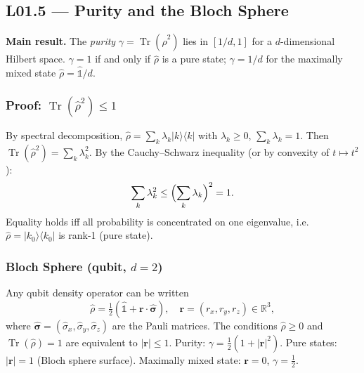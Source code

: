 \documentclass[11pt,a4paper]{article}
\begin{document}
\subsection{L01.5 --- Purity and the Bloch Sphere}
\label{sec:L01.3.3}

\begin{tcolorbox}[goldbox]
\textbf{Main result.}
The \emph{purity} $\gamma=\operatorname{Tr}(\hat{\rho}^2)$ lies in $[1/d,1]$
for a $d$-dimensional Hilbert space.
$\gamma=1$ if and only if $\hat{\rho}$ is a pure state;
$\gamma=1/d$ for the maximally mixed state $\hat{\rho}=\hat{\mathbb{1}}/d$.
\end{tcolorbox}

\subsubsection*{Proof: $\operatorname{Tr}(\hat{\rho}^2)\le 1$}


\medskip\noindent
By spectral decomposition, $\hat{\rho}=\sum_k \lambda_k|k\rangle\langle k|$
with $\lambda_k\ge 0$, $\sum_k\lambda_k=1$.
Then $\operatorname{Tr}(\hat{\rho}^2)=\sum_k\lambda_k^2$.
By the Cauchy--Schwarz inequality (or by convexity of $t\mapsto t^2$):
\begin{equation}
\sum_k\lambda_k^2\le\Bigl(\sum_k\lambda_k\Bigr)^2=1.
\label{eq:L01.2}
\end{equation}
Equality holds iff all probability is concentrated on one eigenvalue,
i.e.\ $\hat{\rho}=|k_0\rangle\langle k_0|$ is rank-1 (pure state).

\subsubsection*{Bloch Sphere (qubit, $d=2$)}

 

\medskip\noindent
Any qubit density operator can be written
\begin{equation}
\hat{\rho}=\tfrac{1}{2}(\hat{\mathbb{1}}+\mathbf{r}\cdot\hat{\boldsymbol{\sigma}}),
\quad \mathbf{r}=(r_x,r_y,r_z)\in\mathbb{R}^3,
\label{eq:L01.3}
\end{equation}
where $\hat{\boldsymbol{\sigma}}=(\hat{\sigma}_x,\hat{\sigma}_y,\hat{\sigma}_z)$
are the Pauli matrices.
The conditions $\hat{\rho}\ge 0$ and $\operatorname{Tr}(\hat{\rho})=1$ are
equivalent to $|\mathbf{r}|\le 1$.
Purity: $\gamma=\tfrac{1}{2}(1+|\mathbf{r}|^2)$.
Pure states: $|\mathbf{r}|=1$ (Bloch sphere surface).
Maximally mixed state: $\mathbf{r}=0$, $\gamma=\tfrac{1}{2}$.
\end{document}
